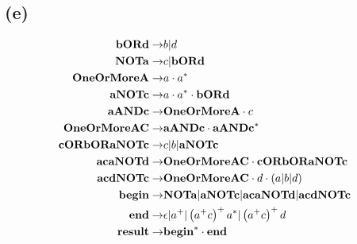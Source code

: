 \documentclass[class=article]{standalone}
\begin{document}
\subsection*{(e)}
\begin{align*}
    {\bf{bORd}} \rightarrow&
        b|d\\
    {\bf{NOTa}} \rightarrow&
        c | {\bf{bORd}} \\
    {\bf{OneOrMoreA}} \rightarrow&
        a \cdot a^*\\
    {\bf{aNOTc}} \rightarrow& 
        a \cdot a^* \cdot {\bf{bORd}}\\ 
    {\bf{aANDc}} \rightarrow& 
        {\bf{OneOrMoreA}} \cdot c\\ 
    {\bf{OneOrMoreAC}} \rightarrow& 
        {\bf{aANDc}} \cdot {\bf{aANDc}}^*\\ 
    {\bf{cORbORaNOTc}}\rightarrow& 
        c | b | {\bf{aNOTc}}\\ 
    {\bf{acaNOTd}} \rightarrow& 
        {\bf{OneOrMoreAC}} \cdot {\bf{cORbORaNOTc}}\\ 
    {\bf{acdNOTc}} \rightarrow& 
        {\bf{OneOrMoreAC}} \cdot d \cdot \left ( a|b|d \right )\\ 
    {\bf{begin}}\rightarrow&
        {\bf{NOTa}} | {\bf{aNOTc}} | {\bf{acaNOTd}} | {\bf{acdNOTc}}  \\
    {\bf{end}} \rightarrow&
        \epsilon| a^+ | \left ( a^+c \right )^+a^* | \left ( a^+c \right )^+d \\
    {\bf{result}} \rightarrow&
        {\bf{begin}}^* \cdot {\bf{end}} \\
\end{align*}
\end{document}
